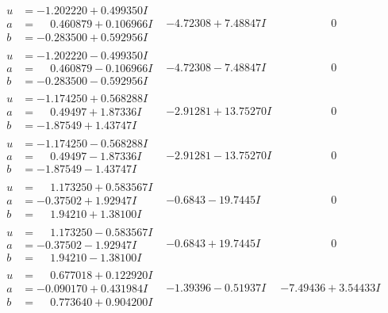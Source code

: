 \documentclass[1p]{elsarticle_modified}
\theoremstyle{definition}
\begin{document}
$$\begin{array}{c|c|c}
\begin{aligned}
u &= -1.202220 + 0.499350 I \\
a &= \phantom{-}0.460879 + 0.106966 I \\
b &= -0.283500 + 0.592956 I\end{aligned}
 & -4.72308 + 7.48847 I & \phantom{-0.000000 } 0 \\ \hline\begin{aligned}
u &= -1.202220 - 0.499350 I \\
a &= \phantom{-}0.460879 - 0.106966 I \\
b &= -0.283500 - 0.592956 I\end{aligned}
 & -4.72308 - 7.48847 I & \phantom{-0.000000 } 0 \\ \hline\begin{aligned}
u &= -1.174250 + 0.568288 I \\
a &= \phantom{-}0.49497 + 1.87336 I \\
b &= -1.87549 + 1.43747 I\end{aligned}
 & -2.91281 + 13.75270 I & \phantom{-0.000000 } 0 \\ \hline\begin{aligned}
u &= -1.174250 - 0.568288 I \\
a &= \phantom{-}0.49497 - 1.87336 I \\
b &= -1.87549 - 1.43747 I\end{aligned}
 & -2.91281 - 13.75270 I & \phantom{-0.000000 } 0 \\ \hline\begin{aligned}
u &= \phantom{-}1.173250 + 0.583567 I \\
a &= -0.37502 + 1.92947 I \\
b &= \phantom{-}1.94210 + 1.38100 I\end{aligned}
 & -0.6843 - 19.7445 I & \phantom{-0.000000 } 0 \\ \hline\begin{aligned}
u &= \phantom{-}1.173250 - 0.583567 I \\
a &= -0.37502 - 1.92947 I \\
b &= \phantom{-}1.94210 - 1.38100 I\end{aligned}
 & -0.6843 + 19.7445 I & \phantom{-0.000000 } 0 \\ \hline\begin{aligned}
u &= \phantom{-}0.677018 + 0.122920 I \\
a &= -0.090170 + 0.431984 I \\
b &= \phantom{-}0.773640 + 0.904200 I\end{aligned}
 & -1.39396 - 0.51937 I & -7.49436 + 3.54433 I\\

\end{array}$$
\end{document}
